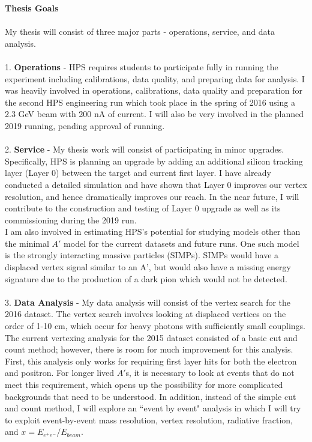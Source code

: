 \documentclass[12pt]{article}
\begin{document}
    \textbf{Thesis Goals} \\
    \\
    	My thesis will consist of three major parts - operations, service, and data analysis. \\
    \\
    1. \textbf{Operations} - HPS requires students to participate fully in running the experiment including calibrations, data quality, and preparing data for analysis. I was heavily involved in operations, calibrations, data quality and preparation for the second HPS engineering run which took place in the spring of 2016 using a 2.3 GeV beam with 200 nA of current. I will also be very involved in the planned 2019 running, pending approval of running.\\
    \\
    2. \textbf{Service} - My thesis work will consist of participating in minor upgrades. Specifically, HPS is planning an upgrade by adding an additional silicon tracking layer (Layer 0) between the target and current first layer. I have already conducted a detailed simulation and have shown that Layer 0 improves our vertex resolution, and hence dramatically improves our reach. In the near future, I will contribute to the construction and testing of Layer 0 upgrade as well as its commissioning during the 2019 run. \\
    	I am also involved in estimating HPS's potential for studying models other than the minimal $A'$ model for the current datasets and future runs. One such model is the strongly interacting massive particles (SIMPs). SIMPs would have a displaced vertex signal similar to an A', but would also have a missing energy signature due to the production of a dark pion which would not be detected.\\
    \\
    3. \textbf{Data Analysis} - My data analysis will consist of the vertex search for the 2016 dataset. The vertex search involves looking at displaced vertices on the order of 1-10 cm, which occur for heavy photons with sufficiently small couplings. The current vertexing analysis for the 2015 dataset consisted of a basic cut and count method; however, there is room for much improvement for this analysis. First, this analysis only works for requiring first layer hits for both the electron and positron. For longer lived $A'$s, it is necessary to look at events that do not meet this requirement, which opens up the possibility for more complicated backgrounds that need to be understood. In addition, instead of the simple cut and count method, I will explore an ``event by event" analysis in which I will try to exploit event-by-event mass resolution, vertex resolution, radiative fraction, and $x=E_{e^+ e^-}/E_{beam}$.
\end{document}
